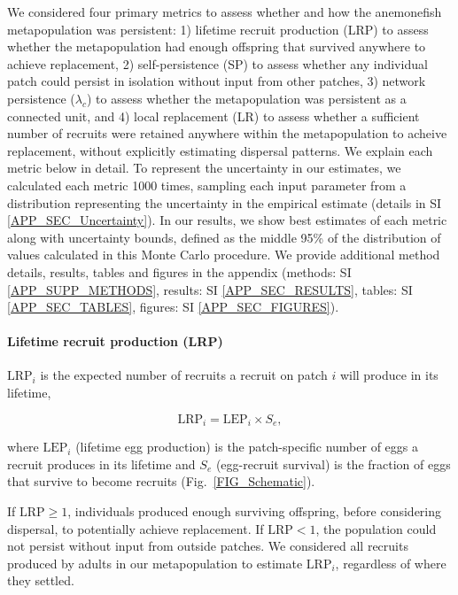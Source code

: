 \documentclass[12pt, oneside]{article}   	%
\begin{document}
We considered four primary metrics to assess whether and how the anemonefish metapopulation was persistent: 1) lifetime recruit production (LRP) to assess whether the metapopulation had enough offspring that survived anywhere to achieve replacement, 2) self-persistence (SP) to assess whether any individual patch could persist in isolation without input from other patches, 3) network persistence ($\lambda_c$) to assess whether the metapopulation was persistent as a connected unit, and 4) local replacement (LR) to assess whether a sufficient number of recruits were retained anywhere within the metapopulation to acheive replacement, without explicitly estimating dispersal patterns. We explain each metric below in detail. To represent the uncertainty in our estimates, we calculated each metric 1000 times, sampling each input parameter from a distribution representing the uncertainty in the empirical estimate (details in SI \ref{APP_SEC_Uncertainty}). In our results, we show best estimates of each metric along with uncertainty bounds, defined as the middle 95\% of the distribution of values calculated in this Monte Carlo procedure. We provide additional method details, results, tables and figures in the appendix (methods: SI \ref{APP_SUPP_METHODS}, results: SI \ref{APP_SEC_RESULTS}, tables: SI \ref{APP_SEC_TABLES}, figures: SI \ref{APP_SEC_FIGURES}).%

\paragraph*{Lifetime recruit production (LRP)}
$\text{LRP}_i$ is the expected number of recruits a recruit on patch $i$ will produce in its lifetime,

\begin{equation}
\text{LRP}_i = \text{LEP}_i \times S_e, \label{EQN_LRP}
\end{equation}

where $\text{LEP}_i$ (lifetime egg production) is the patch-specific number of eggs a recruit produces in its lifetime and $S_e$ (egg-recruit survival) is the fraction of eggs that survive to become recruits (Fig.\ \ref{FIG_Schematic}).

If $\text{LRP} \geq 1$, individuals produced enough surviving offspring, before considering dispersal, to potentially achieve replacement. If $\text{LRP} < 1$, the population could not persist without input from outside patches. We considered all recruits produced by adults in our metapopulation to estimate $\text{LRP}_i$, regardless of where they settled. %
\end{document}
